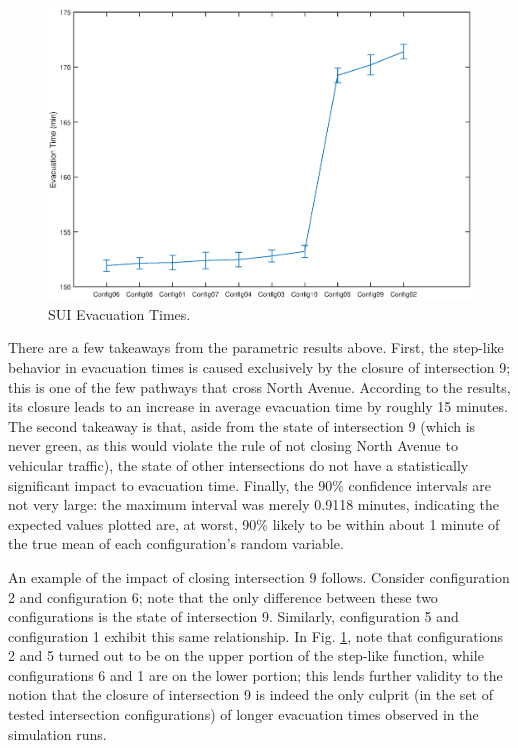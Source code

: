 \documentclass[12pt]{article}
\begin{document}
\begin{figure}[H]
  \includegraphics[width=\linewidth,natwidth=1002,natheight=662]{EvacuationTimes.eps}
  \caption{SUI Evacuation Times.}
  \label{fig:evacuationtimes}
\end{figure}

There are a few takeaways from the parametric results above.  First, the
step-like behavior in evacuation times is caused exclusively by the closure of
intersection 9; this is one of the few pathways that cross North Avenue.
According to the results, its closure leads to an increase in average evacuation
time by roughly 15 minutes.  The second takeaway is that, aside from the state
of intersection 9 (which is never green, as this would violate the rule of
not closing North Avenue to vehicular traffic), the state of other intersections
do not have a statistically significant impact to evacuation time.  Finally,
the 90\% confidence intervals are not very large: the maximum interval was merely
0.9118 minutes, indicating the expected values plotted are, at worst, 90\% likely
to be within about 1 minute of the true mean of each configuration's random variable.

An example of the impact of closing intersection 9 follows. Consider configuration 2
and configuration 6; note that the only difference between these two configurations
is the state of intersection 9. Similarly, configuration 5 and configuration 1
exhibit this same relationship.  In Fig. \ref{fig:evacuationtimes}, note that
configurations 2 and 5 turned out to be on the upper portion of the step-like
function, while configurations 6 and 1 are on the lower portion; this lends
further validity to the notion that the closure of intersection 9 is indeed
the only culprit (in the set of tested intersection configurations) of longer
evacuation times observed in the simulation runs.
\end{document}

